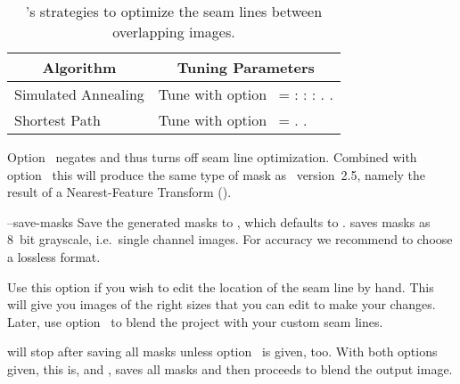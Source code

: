\begin{codelist}
  \begin{table}
    \begin{tabular}{p{.35\linewidth}p{.55\linewidth}}
      \hline
      \multicolumn{1}{c|}{Algorithm} &
      \multicolumn{1}{c}{Tuning Parameters} \\
      \hline\extraheadingsep
      Simulated Annealing & Tune with option~\option{--anneal} = \metavar{TAU} :
      \metavar{DELTA-E-MAX} : \metavar{DELTA-E-MIN} : \metavar{K-MAX}.
      \uref{\wikipediasimulatedannealing}{Simulated-Annealing}.  \fixme{Explain
        Simulated-Annealing!} \\
      \propername{Dijkstra} Shortest Path & Tune with option~\option{--dijkstra} =
      \metavar{RADIUS}.  \uref{\wikipediadijkstraalgorithm}{\propername{Dijkstra} algorithm}.
      \fixme{Explain \propername{Dijkstra} algorithm!}
    \end{tabular}

    \caption[Optimizer strategies]{\label{tab:optimizer-strategies}%
      \App{}'s strategies to optimize the seam lines between overlapping images.}
  \end{table}

  Option~ negates
   and thus turns off seam line optimization.  Combined with
  option~ this will produce the same type of mask as \App{}~version~2.5,
  namely the result of a Nearest-Feature Transform ().


  \label{opt:save-masks}%
\item[--save-masks\optional{=\metavar{IMAGE-TEMPLATE}}]\itemend
  Save the generated masks to , which defaults to
  \mbox{}.  \App{} saves masks as 8~bit grayscale,
  i.e.\ single channel images.  For accuracy we recommend to choose a lossless format.

  Use this option if you wish to edit the location of the seam line by hand.  This will give you
  images of the right sizes that you can edit to make your changes.  Later, use
  option~ to blend the project with your custom seam lines.

  \begin{sloppypar}
    \App{} will stop after saving all masks unless option~ is given, too.  With
    both options given, this is,  and , \App{} saves all
    masks and then proceeds to blend the output image.
  \end{sloppypar}


\end{codelist}
